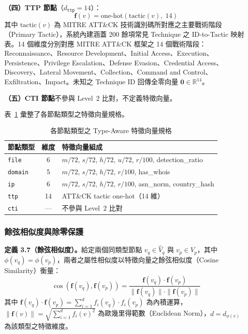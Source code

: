 \begin{ZhChapter}
\textbf{（四）TTP 節點}（$d_{\texttt{ttp}} = 14$）：
\begin{equation}
    \mathbf{f}(v) = \text{one-hot}(\text{tactic}(v),\; 14)
    \label{eq:ttp-feature}
\end{equation}
其中 $\text{tactic}(v)$ 為 MITRE ATT\&CK 技術識別碼所對應之主要戰術階段（Primary Tactic），系統內建涵蓋 200 餘項常見 Technique 之 ID-to-Tactic 映射表。14 個維度分別對應 MITRE ATT\&CK 框架之 14 個戰術階段：Reconnaissance、Resource Development、Initial Access、Execution、Persistence、Privilege Escalation、Defense Evasion、Credential Access、Discovery、Lateral Movement、Collection、Command and Control、Exfiltration、Impact。未知之 Technique ID 回傳全零向量 $\mathbf{0} \in \mathbb{R}^{14}$。

\textbf{（五）CTI 節點}不參與 Level~2 比對，不定義特徵向量。

表~\ref{tab:feature-vectors} 彙整了各節點類型之特徵向量規格。

\begin{table}[htbp]
    \centering
    \caption{各節點類型之 Type-Aware 特徵向量規格}
    \label{tab:feature-vectors}
    \renewcommand\arraystretch{1.2}
    \begin{tabular}{l c l}
        \hline
        \textbf{節點類型} & \textbf{維度} & \textbf{特徵向量組成} \\
        \hline
        \texttt{file}   & 6  & $m/72$, $s/72$, $h/72$, $u/72$, $r/100$, detection\_ratio \\
        \texttt{domain} & 5  & $m/72$, $s/72$, $h/72$, $r/100$, has\_whois \\
        \texttt{ip}     & 6  & $m/72$, $s/72$, $h/72$, $r/100$, asn\_norm, country\_hash \\
        \texttt{ttp}    & 14 & ATT\&CK tactic one-hot（14 維） \\
        \texttt{cti}    & —  & 不參與 Level~2 比對 \\
        \hline
    \end{tabular}
\end{table}


\subsubsection{餘弦相似度與除零保護}

\noindent\textbf{定義 3.7（餘弦相似度）。}給定兩個同類型節點 $v_q \in \hat{V}_q$ 與 $v_p \in \hat{V}_p$，其中 $\phi(v_q) = \phi(v_p)$，兩者之屬性相似度以特徵向量之餘弦相似度（Cosine Similarity）衡量：
\begin{equation}
    \cos(\mathbf{f}(v_q), \mathbf{f}(v_p)) = \frac{\mathbf{f}(v_q) \cdot \mathbf{f}(v_p)}{\|\mathbf{f}(v_q)\| \cdot \|\mathbf{f}(v_p)\|}
    \label{eq:cosine}
\end{equation}
其中 $\mathbf{f}(v_q) \cdot \mathbf{f}(v_p) = \sum_{i=1}^{d} f_i(v_q) \cdot f_i(v_p)$ 為內積運算，$\|\mathbf{f}(v)\| = \sqrt{\sum_{i=1}^{d} f_i(v)^2}$ 為歐幾里得範數（Euclidean Norm），$d = d_{\phi(v)}$ 為該類型之特徵維度。


\end{ZhChapter}
